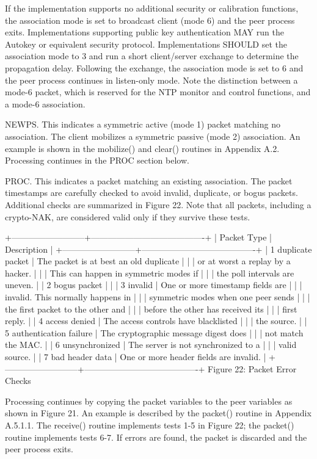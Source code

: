 If the implementation supports no additional security or calibration
functions, the association mode is set to broadcast client (mode 6)
and the peer process exits. Implementations supporting public key
authentication MAY run the Autokey or equivalent security protocol.
Implementations SHOULD set the association mode to 3 and run a short
client/server exchange to determine the propagation delay. Following
the exchange, the association mode is set to 6 and the peer process
continues in listen-only mode. Note the distinction between a mode-6
packet, which is reserved for the NTP monitor and control functions,
and a mode-6 association.

NEWPS. This indicates a symmetric active (mode 1) packet matching no
association. The client mobilizes a symmetric passive (mode 2)
association. An example is shown in the mobilize() and clear()
routines in Appendix A.2. Processing continues in the PROC section
below.

PROC. This indicates a packet matching an existing association. The
packet timestamps are carefully checked to avoid invalid, duplicate,
or bogus packets. Additional checks are summarized in Figure 22.
Note that all packets, including a crypto-NAK, are considered valid
only if they survive these tests.

+--------------------------+----------------------------------------+
| Packet Type | Description |
+--------------------------+----------------------------------------+
| 1 duplicate packet | The packet is at best an old duplicate |
| | or at worst a replay by a hacker. |
| | This can happen in symmetric modes if |
| | the poll intervals are uneven. |
| 2 bogus packet | |
| 3 invalid | One or more timestamp fields are |
| | invalid. This normally happens in |
| | symmetric modes when one peer sends |
| | the first packet to the other and |
| | before the other has received its |
| | first reply. |
| 4 access denied | The access controls have blacklisted |
| | the source. |
| 5 authentication failure | The cryptographic message digest does |
| | not match the MAC. |
| 6 unsynchronized | The server is not synchronized to a |
| | valid source. |
| 7 bad header data | One or more header fields are invalid. |
+--------------------------+----------------------------------------+
Figure 22: Packet Error Checks

Processing continues by copying the packet variables to the peer
variables as shown in Figure 21. An example is described by the
packet() routine in Appendix A.5.1.1. The receive() routine
implements tests 1-5 in Figure 22; the packet() routine implements
tests 6-7. If errors are found, the packet is discarded and the peer
process exits.

